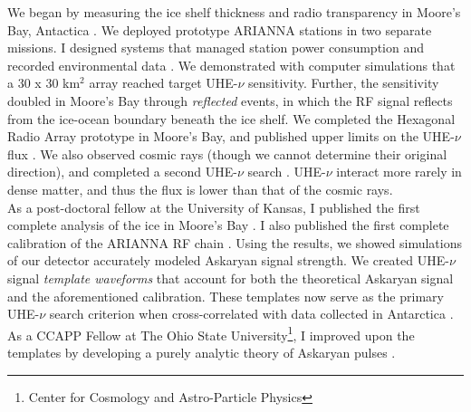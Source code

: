 \documentclass[../../main.tex]{subfiles}
\begin{document}
We began by measuring the ice shelf thickness and radio transparency in Moore's Bay, Antactica \cite{icrc}.  We deployed prototype ARIANNA stations in two separate missions.  I designed systems that managed station power consumption and recorded environmental data \cite{10.1109/tns.2015.2468182} \cite{10.1016/j.nima.2010.09.032}.  We demonstrated with computer simulations that a 30 x 30 km$^2$ array reached target UHE-$\nu$ sensitivity.  Further, the sensitivity doubled in Moore's Bay through \textit{reflected} events, in which the RF signal reflects from the ice-ocean boundary beneath the ice shelf.  We completed the Hexagonal Radio Array prototype in Moore's Bay, and published upper limits on the UHE-$\nu$ flux \cite{10.1016/j.astropartphys.2015.04.002}.  We also observed cosmic rays \cite{cr} (though we cannot determine their original direction), and completed a second UHE-$\nu$ search \cite{4_5}.  UHE-$\nu$ interact more rarely in dense matter, and thus the flux is lower than that of the cosmic rays.
\\
\vspace{0.25cm}
As a post-doctoral fellow at the University of Kansas, I published the first complete analysis of the ice in Moore's Bay \cite{10.3189/2015jog14j214}. I also published the first complete calibration of the ARIANNA RF chain \cite{10.1016/j.astropartphys.2014.09.002}. Using the results, we showed simulations of our detector accurately modeled Askaryan signal strength.  We created UHE-$\nu$ signal \textit{template waveforms} that account for both the theoretical Askaryan signal and the aforementioned calibration.  These templates now serve as the primary UHE-$\nu$ search criterion when cross-correlated with data collected in Antarctica \cite{10.1016/j.astropartphys.2015.04.002} \cite{4_5}.  As a CCAPP Fellow at The Ohio State University\footnote{Center for Cosmology and Astro-Particle Physics}, I improved upon the templates by developing a purely analytic theory of Askaryan pulses \cite{10.1016/j.astropartphys.2017.03.008}.
\\
\vspace{0.25cm}
\end{document}
